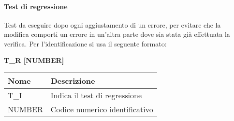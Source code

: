 \paragraph{Test di regressione}  \hfill \break
Test da eseguire dopo ogni aggiustamento di un errore, per evitare che la modifica comporti un errore in 
un’altra parte dove sia stata già effettuata la verifica.\newline
Per l’identificazione si usa il seguente formato:
\begin{center}
    \textbf{T\_R [NUMBER]}
\end{center}
\renewcommand{\arraystretch}{1.8} 
 \begin{tabular}{ |m{7em}|m{30em}| }
        \hline
        \textbf{Nome} & \textbf{Descrizione} \\
        \hline
            T\_I & Indica il test di regressione \\
        \hline
            NUMBER & Codice numerico identificativo \\
        \hline
 \end{tabular}